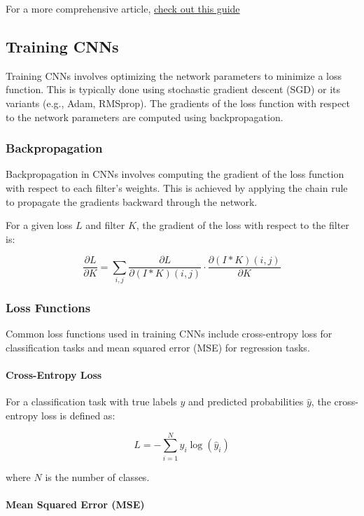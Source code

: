 \documentclass[12pt]{article}
\begin{document}
For a more comprehensive article, \href{https://theaisummer.com/receptive-field/}{check out this guide}

\subsection{Training CNNs}

Training CNNs involves optimizing the network parameters to minimize a loss function. This is typically done using stochastic gradient descent (SGD) or its variants (e.g., Adam, RMSprop). The gradients of the loss function with respect to the network parameters are computed using backpropagation.

\subsubsection{Backpropagation}

Backpropagation in CNNs involves computing the gradient of the loss function with respect to each filter's weights. This is achieved by applying the chain rule to propagate the gradients backward through the network.

For a given loss \( L \) and filter \( K \), the gradient of the loss with respect to the filter is:

\[
\frac{\partial L}{\partial K} = \sum_{i, j} \frac{\partial L}{\partial (I * K)(i, j)} \cdot \frac{\partial (I * K)(i, j)}{\partial K}
\]

\subsubsection{Loss Functions}

Common loss functions used in training CNNs include cross-entropy loss for classification tasks and mean squared error (MSE) for regression tasks.

\paragraph{Cross-Entropy Loss}

For a classification task with true labels \( y \) and predicted probabilities \( \hat{y} \), the cross-entropy loss is defined as:

\[
L = -\sum_{i=1}^{N} y_i \log(\hat{y}_i)
\]

where \( N \) is the number of classes.

\paragraph{Mean Squared Error (MSE)}
\end{document}
